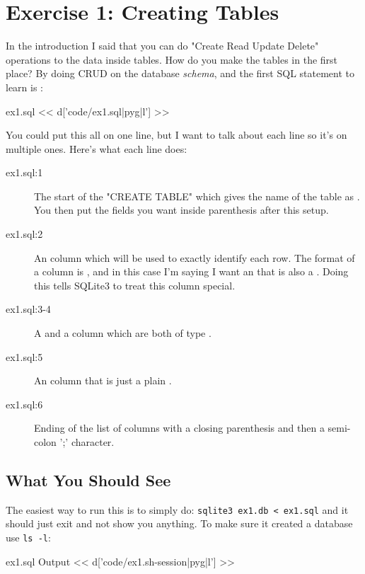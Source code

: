 \chapter{Exercise 1: Creating Tables}

In the introduction I said that you can do "Create Read Update Delete" operations to the data
inside tables.  How do you make the tables in the first place?  By doing CRUD on the database
\emph{schema}, and the first SQL statement to learn is :

\begin{code}{ex1.sql}
<< d['code/ex1.sql|pyg|l'] >>
\end{code}

You could put this all on one line, but I want to talk about each line
so it's on multiple ones.  Here's what each line does:

\begin{description}
\item[ex1.sql:1] The start of the "CREATE TABLE" which gives the name of the
    table as . You then put the fields you want inside parenthesis
    after this setup.
\item[ex1.sql:2] An  column which will be used to exactly identify
    each row.  The format of a column is , and in this case
    I'm saying I want an  that is also a .
    Doing this tells SQLite3 to treat this column special.
\item[ex1.sql:3-4] A  and a  column 
    which are both of type .
\item[ex1.sql:5] An  column that is just a plain .
\item[ex1.sql:6] Ending of the list of columns with a closing parenthesis and
    then a semi-colon ';' character.
\end{description}


\section{What You Should See}

The easiest way to run this is to simply do: \verb|sqlite3 ex1.db < ex1.sql| and
it should just exit and not show you anything.  To make sure it created a
database use \verb|ls -l|:


\begin{code}{ex1.sql Output}
<< d['code/ex1.sh-session|pyg|l'] >>
\end{code}



